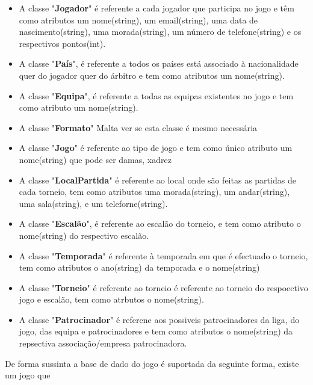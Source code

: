 \documentclass[a4paper]{article}
\begin{document}
\begin{itemize}

\item A classe "\textbf{Jogador}" é referente a cada jogador que participa no jogo e têm como atributos um nome(string), um email(string), uma data de nascimento(string), uma morada(string), um número de telefone(string) e  os respectivos pontos(int).

\item A classe "\textbf{País}", é referente a todos os países  está associado à nacionalidade quer do jogador quer do árbitro e tem como atributos um nome(string).

\item A classe "\textbf{Equipa}", é referente a todas as equipas existentes no jogo e tem como atributo um nome(string).

\item A classe "\textbf{Formato}" Malta ver se esta classe é mesmo necessária

\item A classe "\textbf{Jogo}" é referente ao tipo de jogo e tem  como único atributo um nome(string) que pode ser damas, xadrez

\item A classe "\textbf{LocalPartida}" é referente ao local onde são feitas as partidas de cada torneio, tem como atributos uma morada(string), um andar(string), uma sala(string), e um teleforne(string).

\item A classe "\textbf{Escalão}", é referente ao escalão do torneio, e tem como atributo o nome(string) do respectivo escalão.

\item A classe "\textbf{Temporada}" é referente à temporada em que é efectuado o torneio, tem como atributos o ano(string) da temporada e o nome(string)

\item A classe "\textbf{Torneio}" é referente ao torneio é referente ao torneio do respoectivo jogo e escalão, tem como atrbutos o nome(string).

\item A classe "\textbf{Patrocinador}" é referene aos possiveis patrocinadores da liga, do jogo, das equipa e patrocinadores e tem como atributos o nome(string) da repsectiva associação/empresa patrocinadora.
\end{itemize}

De forma sussinta a base de dado do jogo é suportada da seguinte forma, existe um jogo que 
\end{document}
